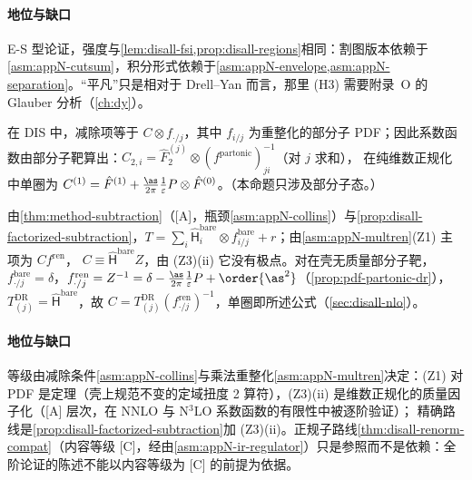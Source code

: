 \paragraph{地位与缺口}
E-S 型论证，强度与\cref{lem:disall-fsi,prop:disall-regions}相同：割图版本依赖于\cref{asm:appN-cutsum}，积分形式依赖于\cref{asm:appN-envelope,asm:appN-separation}。“平凡”只是相对于 Drell--Yan 而言，那里 (H3) 需要附录~O 的 Glauber 分析（\cref{ch:dy}）。

\begin{proposition}\label{prop:disall-h5}
在 DIS 中，减除项等于 $C\otimes f_{\cdot/j}$，其中 $f_{i/j}$ 为重整化的部分子 PDF；因此系数函数由部分子靶算出：$C_{2,i}=\hat F_2^{(j)}\otimes(f^{\mathrm{partonic}})^{-1}_{ji}$（对 $j$ 求和），
在纯维数正规化中单圈为 $C^{(1)}=\hat F^{(1)}+\frac{\as}{2\pi}\frac1\varepsilon P\otimes\hat F^{(0)}$。（本命题只涉及部分子态。）
\end{proposition}

\begin{proofsketch}
由\cref{thm:method-subtraction}（[A]，瓶颈\cref{asm:appN-collins}）与\cref{prop:disall-factorized-subtraction}，$T=\sum_i\hat{\mathsf H}^{\mathrm{bare}}_i\otimes f^{\mathrm{bare}}_{i/j}+r$；由\cref{asm:appN-multren}(Z1) 主项为 $Cf^{\mathrm{ren}}$，
$C\equiv\hat{\mathsf H}^{\mathrm{bare}}Z$，由 (Z3)(ii) 它没有极点。对在壳无质量部分子靶，$f^{\mathrm{bare}}_{\cdot/j}=\delta$，$f^{\mathrm{ren}}_{\cdot/j}=Z^{-1}=\delta-\frac{\as}{2\pi}\frac1\varepsilon P+\order{\as^2}$（\cref{prop:pdf-partonic-dr}），
$T^{\mathrm{DR}}_{(j)}=\hat{\mathsf H}^{\mathrm{bare}}$，故 $C=T^{\mathrm{DR}}_{(j)}(f^{\mathrm{ren}}_{\cdot/j})^{-1}$，单圈即所述公式（\cref{sec:disall-nlo}）。
\end{proofsketch}

\paragraph{地位与缺口}
等级由减除条件\cref{asm:appN-collins}与乘法重整化\cref{asm:appN-multren}决定：(Z1) 对 PDF 是定理（壳上规范不变的定域扭度 2 算符），(Z3)(ii) 是维数正规化的质量因子化（[A] 层次，在 NNLO 与 N$^3$LO 系数函数的有限性中被逐阶验证）；
精确路线是\cref{prop:disall-factorized-subtraction}加 (Z3)(ii)。正规子路线\cref{thm:disall-renorm-compat}（内容等级 [C]，经由\cref{asm:appN-ir-regulator}）只是参照而不是依赖：全阶论证的陈述不能以内容等级为 [C] 的前提为依据。

